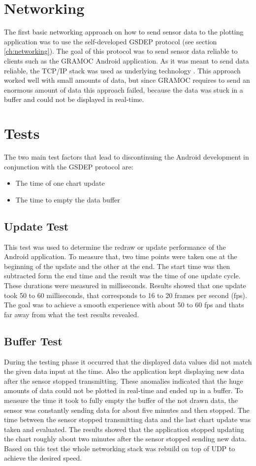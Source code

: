 \section{Networking}
The first basic networking approach on how to send sensor data to the plotting application was to use the self-developed GSDEP protocol (see section \vref{ch:networking}). The goal of this protocol was to send sensor data reliable to clients such as the GRAMOC Android application. As it was meant to send data reliable, the TCP/IP stack was used as underlying technology \autocite{rfc793} \autocite{rfc791}. This approach worked well with small amounts of data, but since GRAMOC requires to send an enormous amount of data this approach failed, because the data was stuck in a buffer and could not be displayed in real-time.

\section{Tests}
\label{sec:Tests}
The two main test factors that lead to discontinuing the Android development in conjunction with the GSDEP protocol are:

\begin{itemize}
    \item The time of one chart update
    \item The time to empty the data buffer
\end{itemize}

\subsection{Update Test}
This test was used to determine the redraw or update performance of the Android application. To measure that, two time points were taken one at the beginning of the update and the other at the end. The start time was then subtracted form the end time and the result was the time of one update cycle. These durations were measured in milliseconds. Results showed that one update took 50 to 60 milliseconds, that corresponds to 16 to 20 frames per second (fps). The goal was to achieve a smooth experience with about 50 to 60 fps and thats far away from what the test results revealed.

\subsection{Buffer Test}
During the testing phase it occurred that the displayed data values did not match the given data input at the time. Also the application kept displaying new data after the sensor stopped transmitting. These anomalies indicated that the huge amounts of data could not be plotted in real-time and ended up in a buffer. To measure the time it took to fully empty the buffer of the not drawn data, the sensor was constantly sending data for about five minutes and then stopped. The time between the sensor stopped transmitting data and the last chart update was taken and evaluated. The results showed that the application stopped updating the chart roughly about two minutes after the sensor stopped sending new data. Based on this test the whole networking stack was rebuild on top of UDP to achieve the desired speed.

